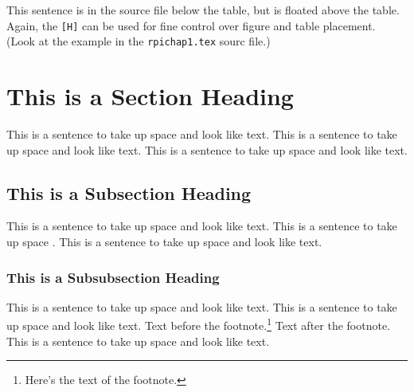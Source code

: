 This sentence is in the source file below the table, but is floated
above the table.  Again, the \verb+[H]+ can be used for fine control
over figure and table placement.  (Look at the example in the
\verb+rpichap1.tex+ sourc file.)
 
\section{This is a Section Heading}
 
This is a sentence to take up space and look like text.
This is a sentence to take up space and look like text.
This is a sentence to take up space and look like text.
 
\subsection{This is a Subsection Heading} 
 
This is a sentence to take up space and look like text.
This is a sentence to take up space \cite{anotherbook}.
This is a sentence to take up space and look like text.
 
\subsubsection{This is a Subsubsection Heading}
This is a sentence to take up space and look like text.
This is a sentence to take up space and look like text.
Text before the footnote.\footnote{Here's the text of the footnote.}
Text after the footnote. 
This is a sentence to take up space and look like text.

